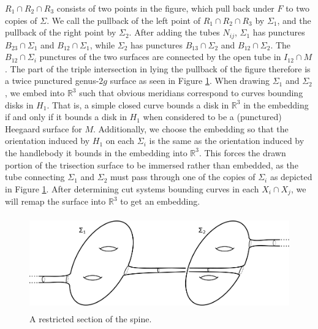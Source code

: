 \documentclass[12pt]{amsart}
\newcommand{\R}{\mathbb{R}}
\theoremstyle{definition}
\theoremstyle{remark}
\begin{document}
$R_1 \cap R_2 \cap R_3$ consists of two points in the figure, which pull back under $F$ to two copies of $\Sigma$.  We call the pullback of the left point of $R_1 \cap R_2 \cap R_3$ by $\Sigma_1$, and the pullback of the right point by $\Sigma_2$.  After adding the tubes $N_{ij}$, $\Sigma_1$ has punctures $B_{23} \cap \Sigma_1$ and $B_{12} \cap \Sigma_1$, while $\Sigma_2$ has punctures $B_{13} \cap \Sigma_2$ and $B_{12} \cap \Sigma_2$.  The $B_{12} \cap \Sigma_i$ punctures of the two surfaces are connected by the open tube in $I_{12} \cap M$.   The part of the triple intersection in lying the pullback of the figure therefore is a twice punctured genus-$2g$ surface as seen in Figure \ref{fig_coresubsurface}.  When drawing $\Sigma_1$ and $\Sigma_2$, we embed into $\R^3$ such that obvious meridians correspond to curves bounding disks in $H_1$.  That is, a simple closed curve bounds a disk in $\R^3$ in the embedding if and only if it bounds a disk in $H_1$ when considered to be a (punctured) Heegaard surface for $M$.  Additionally, we choose the embedding so that the orientation induced by $H_1$ on each $\Sigma_i$ is the same as the orientation induced by the handlebody it bounds in the embedding into $\R^3$.  This forces the drawn portion of the trisection surface to be immersed rather than embedded, as the tube connecting $\Sigma_1$ and $\Sigma_2$ must pass through one of the copies of $\Sigma_i$ as depicted in Figure \ref{fig_coresubsurface}.  After determining cut systems bounding curves in each $X_i \cap X_j$, we will remap the surface into $\R^3$ to get an embedding.

\begin{figure}[h]
\centering
\includegraphics[height=1.6in]{coresubsurface.png}
\caption{A restricted section of the spine.}
\label{fig_coresubsurface}
\end{figure}
\end{document}
